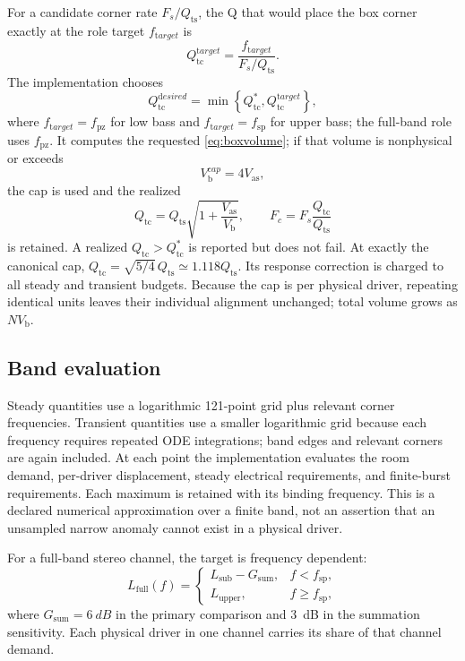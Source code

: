 \documentclass[11pt,a4paper]{article}
\numberwithin{equation}{section}
\newcommand{\Qts}{Q_{\mathrm{ts}}}
\newcommand{\Qtc}{Q_{\mathrm{tc}}}
\newcommand{\Vas}{V_{\mathrm{as}}}
\newcommand{\Vb}{V_{\mathrm{b}}}
\begin{document}
For a candidate corner rate $F_s/\Qts$, the Q that would place the box
corner exactly at the role target $f_{\mathrm target}$ is
\begin{equation}
	\Qtc^{\mathrm target}=
	\frac{f_{\mathrm target}}{F_s/\Qts}.
	\label{eq:qtarget}
\end{equation}
The implementation chooses
\begin{equation}
	\Qtc^{\mathrm desired}=
	\min\left\{\Qtc^\ast,\Qtc^{\mathrm target}\right\},
	\label{eq:qdesired}
\end{equation}
where $f_{\mathrm target}=f_{\mathrm{pz}}$ for low bass and
$f_{\mathrm target}=f_{\mathrm{sp}}$ for upper bass; the full-band role
uses $f_{\mathrm{pz}}$.  It computes the requested
\cref{eq:boxvolume}; if that volume is nonphysical or exceeds
\begin{equation}
	\Vb^{\mathrm cap}=4\Vas,
	\label{eq:boxcap}
\end{equation}
the cap is used and the realized
\begin{equation}
	\Qtc=\Qts\sqrt{1+\frac{\Vas}{\Vb}},
	\qquad
	F_c=F_s\frac{\Qtc}{\Qts}
	\label{eq:realized-alignment}
\end{equation}
is retained.  A realized $\Qtc>\Qtc^\ast$ is reported but does not fail.
At exactly the canonical cap,
$\Qtc=\sqrt{5/4}\,\Qts\simeq1.118\Qts$.
Its response correction is charged to all steady and transient budgets.
Because the cap is per physical driver, repeating identical units leaves
their individual alignment unchanged; total volume grows as $N\Vb$.

\subsection{Band evaluation}

Steady quantities use a logarithmic 121-point grid plus relevant corner
frequencies.  Transient quantities use a smaller logarithmic grid because
each frequency requires repeated ODE integrations; band edges and relevant
corners are again included.  At each point the implementation evaluates the
room demand, per-driver displacement, steady electrical requirements, and
finite-burst requirements.  Each maximum is retained with its binding
frequency.  This is a declared numerical approximation over a finite band,
not an assertion that an unsampled narrow anomaly cannot exist in a physical
driver.

For a full-band stereo channel, the target is frequency dependent:
\begin{equation}
	L_{\mathrm{full}}(f)=
	\begin{cases}
	L_{\mathrm{sub}}-G_{\mathrm{sum}}, & f<f_{\mathrm{sp}},\\
	L_{\mathrm{upper}}, & f\ge f_{\mathrm{sp}},
	\end{cases}
	\label{eq:full-target}
\end{equation}
where $G_{\mathrm{sum}}=\SI{6}{dB}$ in the primary comparison and
\SI{3}{dB} in the summation sensitivity.  Each physical driver in one
channel carries its share of that channel demand.
\end{document}
